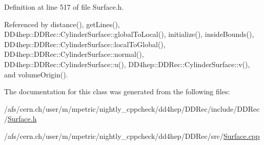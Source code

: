 Definition at line 517 of file Surface.h.

Referenced by distance(), getLines(), DD4hep::DDRec::CylinderSurface::globalToLocal(), initialize(), insideBounds(), DD4hep::DDRec::CylinderSurface::localToGlobal(), DD4hep::DDRec::CylinderSurface::normal(), DD4hep::DDRec::CylinderSurface::u(), DD4hep::DDRec::CylinderSurface::v(), and volumeOrigin().

The documentation for this class was generated from the following files:\begin{DoxyCompactItemize}
\item 
/afs/cern.ch/user/m/mpetric/nightly\_\-cppcheck/dd4hep/DDRec/include/DDRec/\hyperlink{_surface_8h}{Surface.h}\item 
/afs/cern.ch/user/m/mpetric/nightly\_\-cppcheck/dd4hep/DDRec/src/\hyperlink{_surface_8cpp}{Surface.cpp}\end{DoxyCompactItemize}
